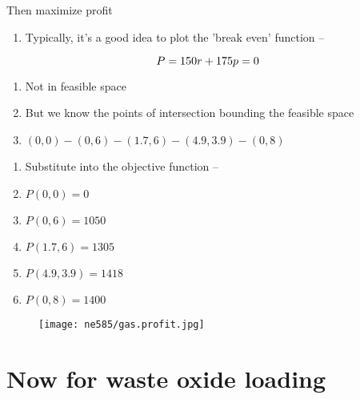 \documentclass[aspectratio=1610,pdftex,dvipsnames,compress,xcolor={dvipsnames}]{beamer}
\begin{document}
\begin{frame}{Then maximize profit}
    \begin{enumerate}[series=outerlist,topsep=0pt,itemsep=1pt,leftmargin=*,label=(\arabic*)]
        \item[]Typically, it's a good idea to plot the 'break even' function --
    \end{enumerate}

    \vspace*{\fill}

    \begin{equation}
        \LARGE
        P = 150r +175p = 0
    \end{equation}

    \vspace*{\fill}

    \begin{enumerate}[series=outerlist,topsep=0pt,itemsep=1pt,leftmargin=*,label=(\arabic*)]
        \item[]Not in feasible space
            \vspace{0.05in}
        \item[]But we know the points of intersection bounding the feasible space
        \item[]$(0,0) - (0,6) - (1.7,6) - (4.9,3.9) - (0,8)$
    \end{enumerate}

    \begin{enumerate}[series=outerlist,topsep=9pt,itemsep=5pt,leftmargin=*,label=(\arabic*)]
        \item[]Substitute into the objective function --
        \item[]$P(0,0) = 0$
        \item[]$P(0,6) = 1050$
        \item[]$P(1.7,6) = 1305$
        \item[]$P(4.9,3.9) = 1418$ 
        \item[]$P(0,8) = 1400$
    \end{enumerate}
\end{frame}


\begin{frame}{}
    \begin{figure}
        \centering
        \texttt{[image: ne585/gas.profit.jpg]}
    \end{figure}
\end{frame}


\section{Now for waste oxide loading}
\end{document}
